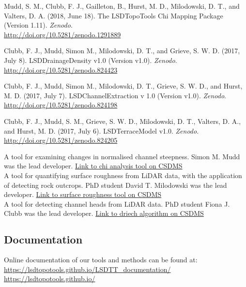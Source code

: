 \documentclass[10pt, a4paper]{article}
\newcommand{\years}[1]{\marginnote{\scriptsize #1}}
\begin{document}
Mudd, S. M., Clubb, F. J., Gailleton, B., Hurst, M. D., Milodowski, D. T., and Valters, D. A. (2018, June 18). The LSDTopoTools Chi Mapping Package (Version 1.11). \textit{Zenodo}.\\ \href{http://doi.org/10.5281/zenodo.1291889}{http://doi.org/10.5281/zenodo.1291889}\par

Clubb, F. J., Mudd, Simon M., Milodowski, D. T., and Grieve, S. W. D. (2017, July 8). LSDDrainageDensity v1.0 (Version v1.0). \textit{Zenodo}.\\ \href{http://doi.org/10.5281/zenodo.824423}{http://doi.org/10.5281/zenodo.824423}\

Clubb, F. J., Mudd, Simon M., Milodowski, D. T., Grieve, S. W. D., and Hurst, M. D. (2017, July 7). LSDChannelExtraction v 1.0 (Version v1.0). \textit{Zenodo}.\\ \href{http://doi.org/10.5281/zenodo.824198}{http://doi.org/10.5281/zenodo.824198}\par

Clubb, F. J., Mudd, S. M., Grieve, S. W. D., Milodowski, D. T., Valters, D. A., and Hurst, M. D. (2017, July 6). LSDTerraceModel v1.0. \textit{Zenodo}.\\ \href{http://doi.org/10.5281/zenodo.824205}{http://doi.org/10.5281/zenodo.824205}\par



\years{CSDMS}A tool for examining changes in normalised channel steepness. Simon M. Mudd was the lead developer. \href{http://csdms.colorado.edu/wiki/Model:Chi_analysis_tools}{Link to chi analysis tool on CSDMS}\\[0.05cm]
A tool for quantifying surface roughness from LiDAR data, with the application of detecting rock outcrops. PhD student David T. Milodowski was the lead developer. \href{http://csdms.colorado.edu/wiki/Model:SurfaceRoughness}{Link to surface roughness tool on CSDMS}\\[0.05cm]
A tool for detecting channel heads from LiDAR data. PhD student Fiona J. Clubb was the lead developer. \href{http://csdms.colorado.edu/wiki/Model:DrEICH_algorithm}{Link to driech algorithm on CSDMS}\\[0.05cm]

\subsection*{Documentation}Online documentation of our tools and methods can be found at:\\[0.05cm]
\url{https://lsdtopotools.github.io/LSDTT_documentation/}\\[0.05cm]
\url{https://lsdtopotools.github.io/}\\[0.05cm]
\end{document}
